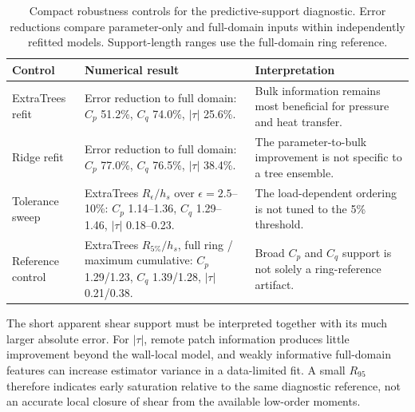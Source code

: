 \documentclass[aip,pof,preprint,floatfix,amsmath,amssymb]{revtex4-2}
\begin{document}
\begin{table}[t]
\centering
\caption{Compact robustness controls for the predictive-support diagnostic. Error reductions compare parameter-only and full-domain inputs within independently refitted models. Support-length ranges use the full-domain ring reference.}
\label{tab:robustness}
\small
\begin{tabular}{lll}
\toprule
\parbox[t]{0.20\textwidth}{Control} & \parbox[t]{0.35\textwidth}{Numerical result} & \parbox[t]{0.34\textwidth}{Interpretation} \\
\midrule
\parbox[t]{0.20\textwidth}{ExtraTrees refit} & \parbox[t]{0.35\textwidth}{Error reduction to full domain: $C_p$ 51.2\%, $C_q$ 74.0\%, $|\tau|$ 25.6\%.} & \parbox[t]{0.34\textwidth}{Bulk information remains most beneficial for pressure and heat transfer.} \\
\parbox[t]{0.20\textwidth}{Ridge refit} & \parbox[t]{0.35\textwidth}{Error reduction to full domain: $C_p$ 77.0\%, $C_q$ 76.5\%, $|\tau|$ 38.4\%.} & \parbox[t]{0.34\textwidth}{The parameter-to-bulk improvement is not specific to a tree ensemble.} \\
\parbox[t]{0.20\textwidth}{Tolerance sweep} & \parbox[t]{0.35\textwidth}{ExtraTrees $R_{\epsilon}/h_s$ over $\epsilon=2.5$--10\%: $C_p$ 1.14--1.36, $C_q$ 1.29--1.46, $|\tau|$ 0.18--0.23.} & \parbox[t]{0.34\textwidth}{The load-dependent ordering is not tuned to the 5\% threshold.} \\
\parbox[t]{0.20\textwidth}{Reference control} & \parbox[t]{0.35\textwidth}{ExtraTrees $R_{5\%}/h_s$, full ring / maximum cumulative: $C_p$ 1.29/1.23, $C_q$ 1.39/1.28, $|\tau|$ 0.21/0.38.} & \parbox[t]{0.34\textwidth}{Broad $C_p$ and $C_q$ support is not solely a ring-reference artifact.} \\
\bottomrule
\end{tabular}
\end{table}

The short apparent shear support must be interpreted together with its much larger absolute error. For $|\tau|$, remote patch information produces little improvement beyond the wall-local model, and weakly informative full-domain features can increase estimator variance in a data-limited fit. A small $R_{95}$ therefore indicates early saturation relative to the same diagnostic reference, not an accurate local closure of shear from the available low-order moments.
\end{document}
